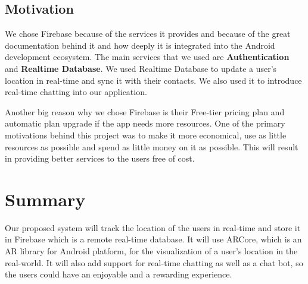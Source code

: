 \subsection{Motivation}
We chose Firebase because of the services it provides and because of the great documentation behind it and how deeply it is integrated into the Android development ecosystem. The main services that we used are \textbf{Authentication} and \textbf{Realtime Database}. We used Realtime Database to update a user's location in real-time and sync it with their contacts. We also used it to introduce real-time chatting into our application.

Another big reason why we chose Firebase is their Free-tier pricing plan \cite{FirebasePricing2018} and automatic plan upgrade if the app needs more resources. One of the primary motivations behind this project was to make it more economical, use as little resources as possible and spend as little money on it as possible. This will result in providing better services to the users free of cost.


\section{Summary}
Our proposed system will track the location of the users in real-time and store it in Firebase which is a remote real-time database. It will use ARCore, which is an AR library for Android platform, for the visualization of a user's location in the real-world. It will also add support for real-time chatting as well as a chat bot, so the users could have an enjoyable and a rewarding experience.



